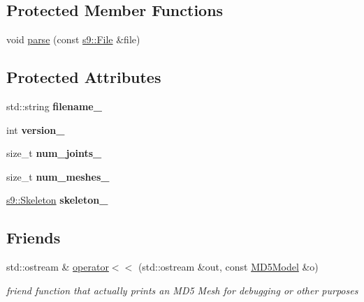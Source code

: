 \subsection*{Protected Member Functions}
\begin{DoxyCompactItemize}
\item 
void \hyperlink{classs9_1_1MD5Model_ae66dbcad9ce47515274dd0d31c58685f}{parse} (const \hyperlink{classs9_1_1File}{s9\-::\-File} \&file)
\end{DoxyCompactItemize}
\subsection*{Protected Attributes}
\begin{DoxyCompactItemize}
\item 
\hypertarget{classs9_1_1MD5Model_ad72ac4b6ec19e49517024183a7fa0ff0}{std\-::string {\bfseries filename\-\_\-}}\label{classs9_1_1MD5Model_ad72ac4b6ec19e49517024183a7fa0ff0}

\item 
\hypertarget{classs9_1_1MD5Model_a02ac69864c0e7f3befeb7d5ce0038c64}{int {\bfseries version\-\_\-}}\label{classs9_1_1MD5Model_a02ac69864c0e7f3befeb7d5ce0038c64}

\item 
\hypertarget{classs9_1_1MD5Model_aa696aa88472708f91283d8bfd60da400}{size\-\_\-t {\bfseries num\-\_\-joints\-\_\-}}\label{classs9_1_1MD5Model_aa696aa88472708f91283d8bfd60da400}

\item 
\hypertarget{classs9_1_1MD5Model_aae8c585db4ea2b517ccbdca53559c9ae}{size\-\_\-t {\bfseries num\-\_\-meshes\-\_\-}}\label{classs9_1_1MD5Model_aae8c585db4ea2b517ccbdca53559c9ae}

\item 
\hypertarget{classs9_1_1MD5Model_a1d1692ca27c68ad62159fd5f2a65431b}{\hyperlink{classs9_1_1Skeleton}{s9\-::\-Skeleton} {\bfseries skeleton\-\_\-}}\label{classs9_1_1MD5Model_a1d1692ca27c68ad62159fd5f2a65431b}

\end{DoxyCompactItemize}
\subsection*{Friends}
\begin{DoxyCompactItemize}
\item 
\hypertarget{classs9_1_1MD5Model_a25ff6ad38a06fbc3cacc3ffa3b8d1035}{std\-::ostream \& \hyperlink{classs9_1_1MD5Model_a25ff6ad38a06fbc3cacc3ffa3b8d1035}{operator$<$$<$} (std\-::ostream \&out, const \hyperlink{classs9_1_1MD5Model}{M\-D5\-Model} \&o)}\label{classs9_1_1MD5Model_a25ff6ad38a06fbc3cacc3ffa3b8d1035}

\begin{DoxyCompactList}\small\item\em friend function that actually prints an M\-D5 Mesh for debugging or other purposes \end{DoxyCompactList}\end{DoxyCompactItemize}


